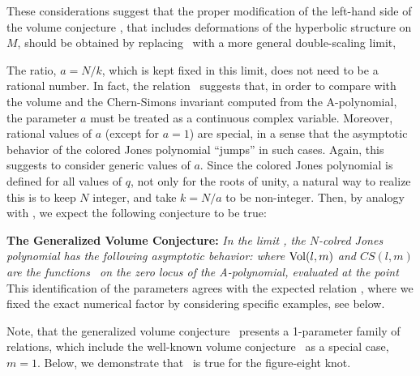 These considerations suggest that the proper modification of
the left-hand side of the volume conjecture \csvolumeconj, that includes
deformations of the hyperbolic structure on $M$, should be obtained by
replacing \kashaevlimit\ with a more general double-scaling limit,
%
\eqn{}
%

The ratio, $a=N/k$, which is kept fixed in this limit,
does not need to be a rational number.
In fact, the relation \expectedm\ suggests that,
in order to compare with the volume and the Chern-Simons invariant
computed from the A-polynomial, the parameter $a$ must be treated
as a continuous complex variable.
Moreover, rational values of $a$ (except for $a=1$) are special,
in a sense that the asymptotic
behavior of the colored Jones polynomial ``jumps'' in such cases.
Again, this suggests to consider generic values of $a$.
Since the colored Jones polynomial is defined for all values of $q$,
not only for the roots of unity,
a natural way to realize this is to keep $N$ integer,
and take $k = N/a$ to be non-integer.
Then, by analogy with \csvolumeconj,
we expect the following conjecture to be true:

{\bf The Generalized Volume Conjecture:}
{\it In the limit \thelimit,
the $N$-colred Jones polynomial has the following asymptotic behavior:
%
\eqn{}
%
where ${\rm Vol} (l,m)$ and $CS (l,m)$ are the functions \csvolint\
on the zero locus of the A-polynomial, evaluated at the point}
%
\eqn{}
%
This identification of the parameters agrees
with the expected relation \expectedm,
where we fixed the exact numerical factor
by considering specific examples, see below.

Note, that the generalized volume conjecture \generalconj\ presents
a 1-parameter family of relations, which include the well-known
volume conjecture \csvolumeconj\ as a special case, $m=1$.
Below, we demonstrate that \generalconj\
is true for the figure-eight knot.

